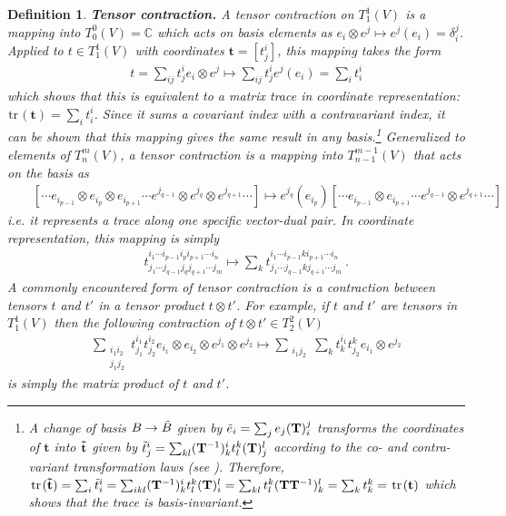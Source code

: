 \documentclass[11pt,fleqn]{article}
\renewcommand{\d}{\delta}    %
\newcommand{\tl}{\ensuremath{\tilde}}
\newcommand{\tr}{\ensuremath{\hspace{1pt}\mathrm{tr}\hspace{1pt}}}
\newcommand{\cd}{\ensuremath{\cdots}}
\newcommand{\bmit}[1]{{\bfseries\itshape\mathversion{bold}#1}}
\newcommand{\mb}[1]{\ensuremath{\mathbb{#1}}}
\newcommand{\bo}[1]{\ensuremath{\mathbf{#1}}}
\newcommand{\miniar}[1]{\ensuremath{\begin{smallmatrix}#1\end{smallmatrix}}}
\theoremstyle{mystyle}
\newtheorem{dfn}{Definition}
\numberwithin{equation}{section}
\begin{document}
\begin{dfn}
\bmit{Tensor contraction.}
A \textit{tensor contraction} on $T_1^1(V)$ is a mapping into $T_0^0(V)=\mb{C}$ which acts on basis elements as $e_i\otimes e^j\mapsto e^j(e_i)=\d_i^j$.
Applied to $t\in T_1^1(V)$ with coordinates $\bo{t}=[t_j^i]$, this mapping takes the form
\begin{align*}
&&
  t
=
  \sum_{ij}
  t_j^i
  e_i\otimes e^j
\mapsto
  \sum_{ij}
  t_j^i
  e^j(e_i)
=
  \sum_i
  t_i^i
\end{align*}
which shows that this is equivalent to a \textit{matrix trace} in coordinate representation: $\tr(\bo{t})=\sum_i t_i^i$.
Since it sums a covariant index with a contravariant index, it can be shown that this mapping gives the same result in any basis.\footnote{A change of basis $B\rightarrow\tl{B}$ given by $\tl{e}_i=\sum_je_j(\bo{T})_i^j$ transforms the coordinates of $\bo{t}$ into $\bo{\tl{t}}$ given by $\tl{t}_j^i=\sum_{kl}(\bo{T}^{-1})_k^it_l^k(\bo{T})_j^l$ according to the  co- and contra-variant transformation laws (see ).  Therefore, $\tr(\bo{\tl{t}})=\sum_i\tl{t}_i^i=\sum_{ikl}(\bo{T}^{-1})_k^it_l^k(\bo{T})_i^l=\sum_{kl}t_l^k(\bo{T}\bo{T}^{-1})_k^l=\sum_k t_k^k=\tr(\bo{t})$ which shows that the trace is basis-invariant.}
Generalized to elements of $T_n^m(V)$, a \textit{tensor contraction} is a mapping into $T_{n-1}^{m-1}(V)$ that acts on the basis as
\begin{align*}
&&
  [\cd e_{i_{p-1}}\otimes e_{i_p}\otimes e_{i_{p+1}}\cd 
  e^{j_{q-1}}\otimes e^{j_q}\otimes e^{j_{q+1}}\cd]
\mapsto
  e^{j_q}(e_{i_p})
  [\cd e_{i_{p-1}}\otimes e_{i_{p+1}}\cd 
  e^{j_{q-1}}\otimes e^{j_{q+1}}\cd]
\end{align*}
i.e. it represents a trace along one specific vector-dual pair.
In coordinate representation, this mapping is simply
\begin{align*}
&&
  t_{j_1\cd j_{q-1}j_qj_{q+1}\cd j_m}^{i_1\cd i_{p-1}i_pi_{p+1}\cd i_n}
\mapsto
  \sum_k
  t_{j_1\cd j_{q-1}kj_{q+1}\cd j_m}^{i_1\cd i_{p-1}ki_{p+1}\cd i_n}\ .
\end{align*}
A commonly encountered form of tensor contraction is a contraction \textit{between} tensors $t$ and $t'$ in a tensor product $t\otimes t'$.
For example, if $t$ and $t'$ are tensors in $T_1^1(V)$ then the following contraction of $t\otimes t'\in T_2^2(V)$
\begin{align*}
&&
  \sum_{\miniar{i_1i_2\\j_1j_2}}
  t_{j_1}^{i_1}t_{j_2}^{i_2}
  e_{i_1}\otimes e_{i_2}\otimes e^{j_1}\otimes e^{j_2}
\mapsto
  \sum_{\miniar{i_1j_2}}
  \sum_k
  t_{k}^{i_1}t_{j_2}^{k}
  e_{i_1}\otimes e^{j_2}
\end{align*}
is simply the matrix product of $t$ and $t'$.
\end{dfn}
\end{document}
